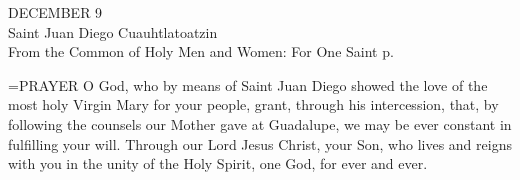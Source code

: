 \begin{center}\normalsize DECEMBER 9\\
\footnotesize Saint Juan Diego Cuauhtlatoatzin\\
\footnotesize From the Common of Holy Men and Women: For One Saint p.\\
\end{center}


\hangindent=\parindent \small{PRAYER 
O God, who by means of Saint Juan Diego showed
the love of the most holy Virgin Mary for your people,
grant, through his intercession,
that, by following the counsels our Mother gave at Guadalupe,
we may be ever constant in fulfilling your will.
Through our Lord Jesus Christ, your Son,
who lives and reigns with you in the unity of the Holy Spirit,
one God, for ever and ever.\\}
 
